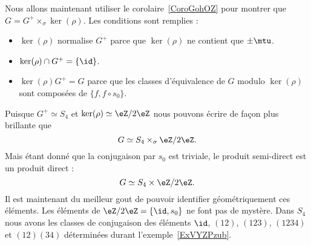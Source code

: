 Nous allons maintenant utiliser le corolaire~\ref{CoroGohOZ} pour montrer que \( G=G^+\times_{\sigma}\ker(\rho)\). Les conditions sont remplies :
\begin{itemize}
	\item \( \ker(\rho)\) normalise \( G^+\) parce que \( \ker(\rho)\) ne contient que \( \pm\mtu\).
	\item \( \ker(\rho)\cap G^+=\{ \id \}\).
	\item \( \ker(\rho)G^+=G\) parce que les classes d'équivalence de \( G\) modulo \( \ker(\rho)\) sont composées de \( \{ f,f\circ s_0 \}\).
\end{itemize}
Puisque \( G^+\simeq S_4\) et \( \ker(\rho)\simeq \eZ/2\eZ\) nous pouvons écrire de façon plus brillante que
\begin{equation}
	G\simeq S_4\times_{\sigma}\eZ/2\eZ.
\end{equation}
Mais étant donné que la conjugaison par \( s_0\) est triviale, le produit semi-direct est un produit direct :
\begin{equation}
	G\simeq S_4\times\eZ/2\eZ.
\end{equation}
Il est maintenant du meilleur gout de pouvoir identifier géométriquement ces éléments. Les éléments de \( \eZ/2\eZ=\{ \id,s_0 \}\) ne font pas de mystère. Dans \( S_4\) nous avons les classes de conjugaison des éléments \( \id\), \( (12)\), \( (123)\), \( (1234)\) et \( (12)(34)\) déterminées durant l'exemple~\ref{ExVYZPzub}.
